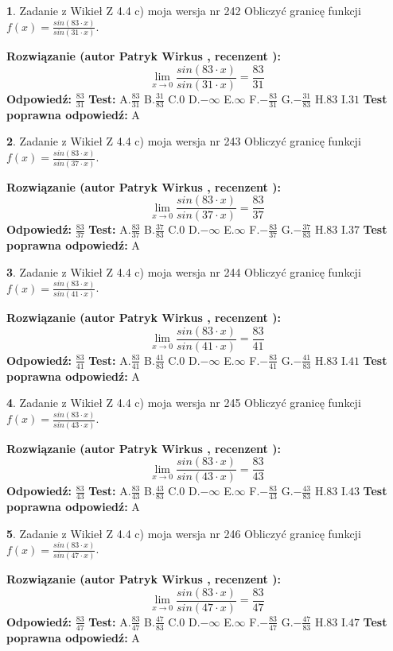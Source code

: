 \documentclass[12pt, a4paper]{article}
\theoremstyle{definition} %
\newtheorem{zad}{}
\newcommand{\zadStart}[1]{\begin{zad}#1\newline}
\newcommand{\zadStop}{\end{zad}}
\newcommand{\rozwStart}[2]{\noindent \textbf{Rozwiązanie (autor #1 , recenzent #2): }\newline}
\newcommand{\rozwStop}{\newline}
\newcommand{\odpStart}{\noindent \textbf{Odpowiedź:}\newline}
\newcommand{\odpStop}{\newline}
\newcommand{\testStart}{\noindent \textbf{Test:}\newline}
\newcommand{\testStop}{\newline}
\newcommand{\kluczStart}{\noindent \textbf{Test poprawna odpowiedź:}\newline}
\newcommand{\kluczStop}{\newline}
\begin{document}
\zadStart{Zadanie z Wikieł Z 4.4 c) moja wersja nr 242}
Obliczyć granicę funkcji $f(x)=\frac{sin(83\cdot x)}{sin(31\cdot x)}$.
\zadStop
\rozwStart{Patryk Wirkus}{}
$$\lim\limits_{x\to 0}\frac{sin(83\cdot x)}{sin(31\cdot x)}=
\frac{83}{31}$$
\rozwStop
\odpStart
$\frac{83}{31}$
\odpStop
\testStart
A.$\frac{83}{31}$
B.$\frac{31}{83}$
C.$0$
D.$-\infty$
E.$\infty$
F.$-\frac{83}{31}$
G.$-\frac{31}{83}$
H.$83$
I.$31$
\testStop
\kluczStart
A
\kluczStop



\zadStart{Zadanie z Wikieł Z 4.4 c) moja wersja nr 243}
Obliczyć granicę funkcji $f(x)=\frac{sin(83\cdot x)}{sin(37\cdot x)}$.
\zadStop
\rozwStart{Patryk Wirkus}{}
$$\lim\limits_{x\to 0}\frac{sin(83\cdot x)}{sin(37\cdot x)}=
\frac{83}{37}$$
\rozwStop
\odpStart
$\frac{83}{37}$
\odpStop
\testStart
A.$\frac{83}{37}$
B.$\frac{37}{83}$
C.$0$
D.$-\infty$
E.$\infty$
F.$-\frac{83}{37}$
G.$-\frac{37}{83}$
H.$83$
I.$37$
\testStop
\kluczStart
A
\kluczStop



\zadStart{Zadanie z Wikieł Z 4.4 c) moja wersja nr 244}
Obliczyć granicę funkcji $f(x)=\frac{sin(83\cdot x)}{sin(41\cdot x)}$.
\zadStop
\rozwStart{Patryk Wirkus}{}
$$\lim\limits_{x\to 0}\frac{sin(83\cdot x)}{sin(41\cdot x)}=
\frac{83}{41}$$
\rozwStop
\odpStart
$\frac{83}{41}$
\odpStop
\testStart
A.$\frac{83}{41}$
B.$\frac{41}{83}$
C.$0$
D.$-\infty$
E.$\infty$
F.$-\frac{83}{41}$
G.$-\frac{41}{83}$
H.$83$
I.$41$
\testStop
\kluczStart
A
\kluczStop



\zadStart{Zadanie z Wikieł Z 4.4 c) moja wersja nr 245}
Obliczyć granicę funkcji $f(x)=\frac{sin(83\cdot x)}{sin(43\cdot x)}$.
\zadStop
\rozwStart{Patryk Wirkus}{}
$$\lim\limits_{x\to 0}\frac{sin(83\cdot x)}{sin(43\cdot x)}=
\frac{83}{43}$$
\rozwStop
\odpStart
$\frac{83}{43}$
\odpStop
\testStart
A.$\frac{83}{43}$
B.$\frac{43}{83}$
C.$0$
D.$-\infty$
E.$\infty$
F.$-\frac{83}{43}$
G.$-\frac{43}{83}$
H.$83$
I.$43$
\testStop
\kluczStart
A
\kluczStop



\zadStart{Zadanie z Wikieł Z 4.4 c) moja wersja nr 246}
Obliczyć granicę funkcji $f(x)=\frac{sin(83\cdot x)}{sin(47\cdot x)}$.
\zadStop
\rozwStart{Patryk Wirkus}{}
$$\lim\limits_{x\to 0}\frac{sin(83\cdot x)}{sin(47\cdot x)}=
\frac{83}{47}$$
\rozwStop
\odpStart
$\frac{83}{47}$
\odpStop
\testStart
A.$\frac{83}{47}$
B.$\frac{47}{83}$
C.$0$
D.$-\infty$
E.$\infty$
F.$-\frac{83}{47}$
G.$-\frac{47}{83}$
H.$83$
I.$47$
\testStop
\kluczStart
A
\kluczStop
\end{document}
